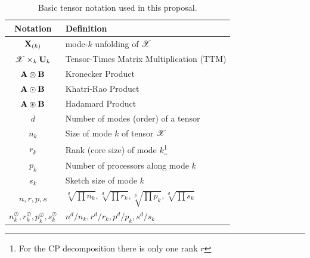 \begin{table}[ht]
  \centering\footnotesize
  \label{tab:notation}
  \begin{tabular}{cl}
    \toprule
    Notation & Definition \\
    \midrule
    $\M{X}_{(k)}$ & mode-$k$ unfolding of $\T{X}$ \\
    $\T{X}\times_k \M{U}_k$ & Tensor-Times Matrix Multiplication (TTM) \\
    $\M{A}\otimes\M{B}$ & Kronecker Product \\
    $\M{A}\odot\M{B}$ & Khatri-Rao Product \\
    $\M{A}\circledast \M{B}$ & Hadamard Product \\
    \midrule
    $d$ & Number of modes (order) of a tensor \\
    $n_k$ & Size of mode $k$ of tensor $\T{X}$ \\
    $r_k$ & Rank (core size) of mode $k$\footnote{For the CP decomposition there is only one rank $r$} \\
    $p_k$ & Number of processors along mode $k$ \\
    $s_k$ & Sketch size of mode $k$ \\
    $n,r,p,s$ & $\sqrt[d]{\prod n_k}, \sqrt[d]{\prod r_k}, \sqrt[p]{\prod p_k}, \sqrt[d]{\prod s_k}$ \\
    $n_k^\oslash,r_k^\oslash,p_k^\oslash,s_k^\oslash$ & $n^d/n_k,r^d/r_k,p^d/p_k,s^d/s_k$ \\
    \bottomrule
  \end{tabular}
  \caption{Basic tensor notation used in this proposal.}
\end{table}
%

